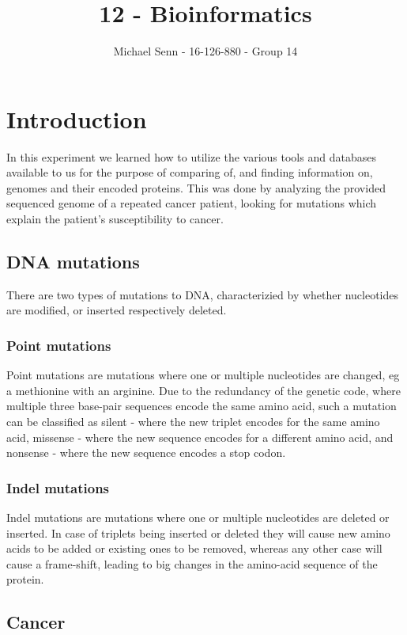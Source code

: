 \documentclass[a4paper,english]{scrreprt}
\title{12 - Bioinformatics}
\author{Michael Senn \maillink{michael.senn@students.unibe.ch} - 16-126-880 - Group 14}
\date{\printdate}
\begin{document}
\maketitle

\chapter{Introduction}

In this experiment we learned how to utilize the various tools and databases
available to us for the purpose of comparing of, and finding information on,
genomes and their encoded proteins. This was done by analyzing the provided
sequenced genome of a repeated cancer patient, looking for mutations which
explain the patient's susceptibility to cancer.

\section{DNA mutations}

There are two types of mutations to DNA, characterizied by whether nucleotides
are modified, or inserted respectively deleted.

\subsection{Point mutations}

Point mutations are mutations where one or multiple nucleotides are changed, eg
a methionine with an arginine. Due to the redundancy of the genetic code, where
multiple three base-pair sequences encode the same amino acid, such a mutation
can be classified as silent - where the new triplet encodes for the same amino
acid, missense - where the new sequence encodes for a different amino acid, and
nonsense - where the new sequence encodes a stop codon.

\subsection{Indel mutations}

Indel mutations are mutations where one or multiple nucleotides are deleted or
inserted. In case of triplets being inserted or deleted they will cause new
amino acids to be added or existing ones to be removed, whereas any other case
will cause a frame-shift, leading to big changes in the amino-acid sequence of
the protein.

\section{Cancer}
\end{document}
